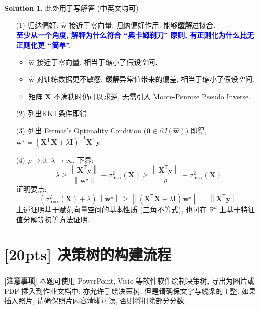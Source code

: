 \documentclass[a4paper]{article}
\numberwithin{equation}{section}
\theoremstyle{definition}
\newtheorem*{solution}{Solution}
\def \transposed {\mathsf{T}}
\def \Real {\mathbb{R}}
\def \I {\mathbf{I}}
\def \X {\mathbf{X}}
\def \wh {\hat{\bm{w}}}
\def \ws {\bm{w}^\star}
\def \y {\bm{y}}
\newcommand\norm[1]{\left\| #1 \right\|}
\begin{document}
\begin{solution}
    此处用于写解答 (中英文均可)
    \begin{itemize}
        \item[(1)] 归纳偏好: $\wh$ 接近于零向量. 归纳偏好作用: 能够\textbf{缓解}过拟合.  \\
              \textcolor{blue}{\textbf{至少从一个角度, 解释为什么符合 ``奥卡姆剃刀'' 原则, 有正则化为什么比无正则化更 ``简单''.}}
              \begin{itemize}
                  \item $\wh$ 接近于零向量, 相当于缩小了假设空间.
                  \item $\wh$ 对训练数据更不敏感, \textbf{缓解}异常值带来的偏差, 相当于缩小了假设空间.
                  \item 矩阵 $\X$ 不满秩时仍可以求逆, 无需引入 Moore-Penrose Pseudo Inverse.
              \end{itemize}
        \item[(2)] 列出KKT条件即得.
        \item[(3)] 列出 Fermat's Optimality Condition ($\bm{0} \in \partial J(\wh)$) 即得, $\ws = \left( \X^\transposed \X + \lambda \I \right)^{-1} \X^\transposed \y$.
        \item[(4)] $\rho \to 0$, $\lambda \to \infty$.
              下界:
              $$ \lambda \geqslant \frac{\norm{\X^\transposed \y}}{\norm{\ws}} - \sigma_{\max}^2(\X) \geqslant \frac{\norm{\X^\transposed \y}}{\rho} - \sigma_{\max}^2(\X) $$
              证明要点:
              $$ \left( \sigma_{\max}^2(\X) + \lambda \right) \norm{\ws} \geqslant \norm{\left( \X^\transposed \X + \lambda \I \right) \ws} = \norm{\X^\transposed \y} $$
              上述证明基于赋范向量空间的基本性质 (三角不等式), 也可在 $\Real^d$ 上基于特征值分解等初等方法证明.
    \end{itemize}
\end{solution}

\newpage

\section{[20pts] 决策树的构建流程}

\begin{tcolorbox}
    \textbf{[注意事项]} 本题可使用 PowerPoint\textsuperscript{\textregistered}, Visio\textsuperscript{\textregistered} 等软件软件绘制决策树, 导出为图片或 PDF 插入到作业文档中; 亦允许手绘决策树, 但是请确保文字与线条的工整. 如果插入照片, 请确保照片内容清晰可读, 否则将扣除部分分数.
\end{tcolorbox}
\end{document}
